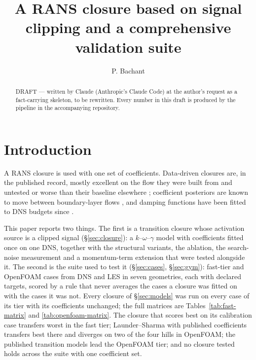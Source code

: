 \documentclass[lineno]{jfm}
\title{A RANS closure based on signal clipping and a comprehensive
validation suite}
\author{P. Bachant\aff{1}
  \corresp{\email{pbachant@caltech.edu}}}
\affiliation{\aff{1}California Institute of Technology, Pasadena, CA 91125, USA}
\begin{document}
\maketitle

\begin{abstract}
DRAFT --- written by Claude (Anthropic's Claude Code) at the author's
request as a fact-carrying skeleton, to be rewritten. Every number in this
draft is produced by the pipeline in the accompanying repository.
\end{abstract}

\section{Introduction}\label{sec:introduction}


A RANS closure is used with one set of coefficients. Data-driven closures
are, in the published record, mostly excellent on the flow they were built
from and untested or worse than their baseline elsewhere
\citep{Duraisamy2019, Brunton2020, SandbergZhao2022, Nishi2024,
RumseyColemanWang2022}; coefficient posteriors are known to move between
boundary-layer flows \citep{Edeling2014}, and damping functions have been
fitted to DNS budgets since \citet{RodiMansour1993}.

This paper reports two things. The first is a transition closure whose
activation source is a clipped signal (\S\ref{sec:closure}): a
$k$--$\omega$--$\gamma$ model with \result[NFittedCoeffs]{} coefficients
fitted once on one DNS, together with the structural variants, the ablation,
the search-noise measurement and a momentum-term extension that were tested
alongside it. The second is the suite used to test it (\S\ref{sec:cases},
\S\ref{sec:gym}):  fast-tier and
 OpenFOAM cases from DNS and LES in seven geometries,
each with declared targets, scored by a rule that never averages the cases a
closure was fitted on with the cases it was not. Every closure of
\S\ref{sec:models} was run on every case of its tier with its coefficients
unchanged; the full matrices are Tables~\ref{tab:fast-matrix} and
\ref{tab:openfoam-matrix}. The closure that scores best on its calibration
case transfers worst in the fast tier; Launder--Sharma with published
coefficients transfers best there and diverges on two of the four hills in
OpenFOAM; the published transition models lead the OpenFOAM tier; and no
closure tested holds across the suite with one coefficient set.
\end{document}
